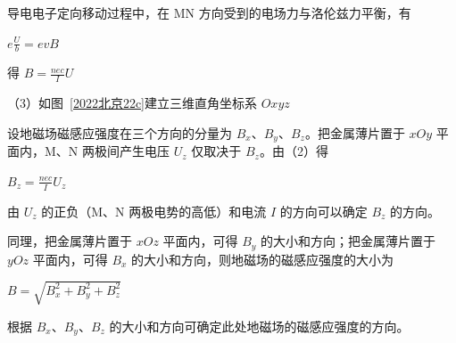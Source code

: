 \documentclass[\gkver]{gaokaozhenti}
\begin{document}
\begin{enumerate}
{导电电子定向移动过程中，在 MN 方向受到的电场力与洛伦兹力平衡，有

$e\frac{U}{b} = evB$

得 $B = \frac{nec}{I}U$

（3）如图~\ref{2022北京22c}建立三维直角坐标系 $Oxyz$


设地磁场磁感应强度在三个方向的分量为 $B_{x}$、$B_{y}$、$B_{z}$。把金属薄片置于 $xOy$ 平面内，M、N 两极间产生电压 $U_{z}$ 仅取决于 $B_{z}$。由（2）得

$B_{z} = \frac{nec}{I}U_{z}$

由 $U_{z}$ 的正负（M、N 两极电势的高低）和电流 $I$ 的方向可以确定 $B_{z}$ 的方向。

同理，把金属薄片置于 $xOz$ 平面内，可得 $B_{y}$ 的大小和方向；把金属薄片置于 $yOz$ 平面内，可得 $B_{x}$ 的大小和方向，则地磁场的磁感应强度的大小为

$B = \sqrt{B_{x}^{2} + B_{y}^{2} + B_{z}^{2}}$

根据 $B_{x}$、$B_{y}$、$B_{z}$ 的大小和方向可确定此处地磁场的磁感应强度的方向。
}

\end{enumerate}
\end{document}
